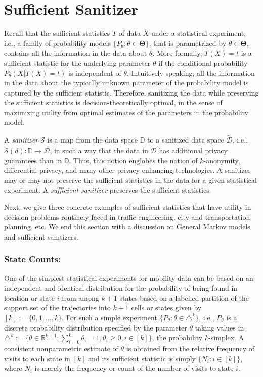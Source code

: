 \section{Sufficient Sanitizer}\label{S:SufficientSanitizer}\label{Sec:SufficientS}

Recall that the sufficient statistics $T$ of data $X$ under a statistical experiment, i.e., a family of probability models $\{P_{\theta}: \theta \in \mathbf{\Theta}\}$, that is parametrized by $\theta \in \mathbf{\Theta}$, contains all the information in the data about $\theta$.  
More formally, $T(X)=t$ is a sufficient statistic for the underlying parameter $\theta$ if the conditional probability $P_{\theta}(X | T(X)=t)$ is independent of $\theta$.  
Intuitively speaking, all the information in the data about the typically unknown parameter of the probability model is captured by the sufficient statistic.  
Therefore, sanitizing the data while preserving the sufficient statistics is decision-theoretically optimal, in the sense of maximizing utility from optimal estimates of the parameters in the probability model.

A {\em sanitizer} $\mathcal{S}$ is a map from the data space $\mathbb{D}$ to a sanitized data space $\tilde{\mathcal{D}}$, i.e., $\mathcal{S}(d): \mathbb{D} \to \tilde{\mathcal{D}}$, in such a way that the data in $\tilde{\mathcal{D}}$ has additional privacy guarantees than in $\mathbb{D}$.
Thus, this notion englobes the notion of $k$-anonymity, differential privacy, and many other privacy enhancing technologies.  
A sanitizer may or may not preserve the sufficient statistics in the data for a given statistical experiment.
A {\em sufficient sanitizer} preserves the sufficient statistics. 

Next, we give three concrete examples of sufficient statistics that have utility in decision problems routinely faced in traffic engineering, city and transportation planning, etc.  
We end this section with a discussion on General Markov models and sufficient sanitizers.

\subsubsection{State Counts:}
One of the simplest statistical experiments for mobility data can be based on an independent and identical distribution for the probability of being found in location or state $i$ from among $k+1$ states based on a labelled partition of the support set of the trajectories into $k+1$ cells or states given by $[k] := \{0,1,\ldots,k\}$.  
For such a simple experiment $\{P_{\theta}: \theta \in \triangle^k \}$, i.e., $P_{\theta}$ is a discrete probability distribution specified by the 
parameter $\theta$ taking values in 
$\triangle^k := \{ \theta \in \mathbb{R}^{k+1} : \sum_{i=0}^k \theta_i = 1, \theta_i \geq 0, i \in [k] \}$, 
the probability $k$-simplex. 
A consistent nonparametric estimate of $\theta$ is obtained from the relative frequency of visits to each state in $[k]$ and its sufficient statistic is simply $\{N_i: i \in [k]\}$, where $N_i$ is merely the frequency or count of the number of visits to state $i$.  

